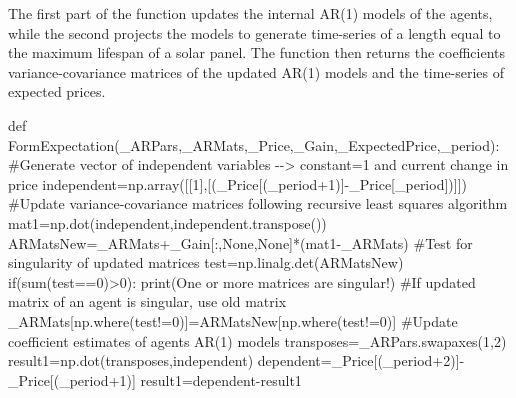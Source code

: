 \documentclass[
  letterpaper,
  DIV=11,
  numbers=noendperiod]{scrartcl}
\newenvironment{Shaded}{\begin{snugshade}}{\end{snugshade}}
\newcommand{\BuiltInTok}[1]{\textcolor[rgb]{0.00,0.23,0.31}{#1}}
\newcommand{\CommentTok}[1]{\textcolor[rgb]{0.37,0.37,0.37}{#1}}
\newcommand{\ControlFlowTok}[1]{\textcolor[rgb]{0.00,0.23,0.31}{#1}}
\newcommand{\DecValTok}[1]{\textcolor[rgb]{0.68,0.00,0.00}{#1}}
\newcommand{\KeywordTok}[1]{\textcolor[rgb]{0.00,0.23,0.31}{#1}}
\newcommand{\NormalTok}[1]{\textcolor[rgb]{0.00,0.23,0.31}{#1}}
\newcommand{\OperatorTok}[1]{\textcolor[rgb]{0.37,0.37,0.37}{#1}}
\newcommand{\StringTok}[1]{\textcolor[rgb]{0.13,0.47,0.30}{#1}}
\newcommand{\VariableTok}[1]{\textcolor[rgb]{0.07,0.07,0.07}{#1}}
\begin{document}
The first part of the function updates the internal AR(1) models of the
agents, while the second projects the models to generate time-series of
a length equal to the maximum lifespan of a solar panel. The function
then returns the coefficients variance-covariance matrices of the
updated AR(1) models and the time-series of expected prices.

\begin{Shaded}
\begin{Highlighting}[]
\KeywordTok{def}\NormalTok{ FormExpectation(\_ARPars,\_ARMats,\_Price,\_Gain,\_ExpectedPrice,\_period):}
    \CommentTok{\#Generate vector of independent variables {-}{-}\textgreater{} constant=1 and current change in price}
\NormalTok{    independent}\OperatorTok{=}\NormalTok{np.array([[}\DecValTok{1}\NormalTok{],[(\_Price[(\_period}\OperatorTok{+}\DecValTok{1}\NormalTok{)]}\OperatorTok{{-}}\NormalTok{\_Price[\_period])]])}
    \CommentTok{\#Update variance{-}covariance matrices following recursive least squares algorithm}
\NormalTok{    mat1}\OperatorTok{=}\NormalTok{np.dot(independent,independent.transpose())}
\NormalTok{    ARMatsNew}\OperatorTok{=}\NormalTok{\_ARMats}\OperatorTok{+}\NormalTok{\_Gain[:,}\VariableTok{None}\NormalTok{,}\VariableTok{None}\NormalTok{]}\OperatorTok{*}\NormalTok{(mat1}\OperatorTok{{-}}\NormalTok{\_ARMats)}
    \CommentTok{\#Test for singularity of updated matrices}
\NormalTok{    test}\OperatorTok{=}\NormalTok{np.linalg.det(ARMatsNew)}
    \ControlFlowTok{if}\NormalTok{(}\BuiltInTok{sum}\NormalTok{(test}\OperatorTok{==}\DecValTok{0}\NormalTok{)}\OperatorTok{\textgreater{}}\DecValTok{0}\NormalTok{):}
        \BuiltInTok{print}\NormalTok{(}\StringTok{\textquotesingle{}One or more matrices are singular!\textquotesingle{}}\NormalTok{)}
    \CommentTok{\#If updated matrix of an agent is singular, use old matrix}
\NormalTok{    \_ARMats[np.where(test}\OperatorTok{!=}\DecValTok{0}\NormalTok{)]}\OperatorTok{=}\NormalTok{ARMatsNew[np.where(test}\OperatorTok{!=}\DecValTok{0}\NormalTok{)]}
    \CommentTok{\#Update coefficient estimates of agents\textquotesingle{} AR(1) models}
\NormalTok{    transposes}\OperatorTok{=}\NormalTok{\_ARPars.swapaxes(}\DecValTok{1}\NormalTok{,}\DecValTok{2}\NormalTok{)}
\NormalTok{    result1}\OperatorTok{=}\NormalTok{np.dot(transposes,independent)}
\NormalTok{    dependent}\OperatorTok{=}\NormalTok{\_Price[(\_period}\OperatorTok{+}\DecValTok{2}\NormalTok{)]}\OperatorTok{{-}}\NormalTok{\_Price[(\_period}\OperatorTok{+}\DecValTok{1}\NormalTok{)]}
\NormalTok{    result1}\OperatorTok{=}\NormalTok{dependent}\OperatorTok{{-}}\NormalTok{result1}

\end{Highlighting}
\end{Shaded}
\end{document}
